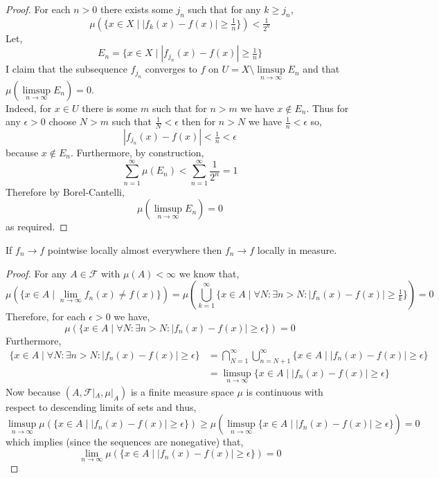 \documentclass[12pt]{article}
\renewcommand{\F}{\mathcal{F}}
\begin{document}
\begin{proof}
For each $n > 0$ there exists some $j_{n}$ such that for any $k \ge j_{n}$,
\[ \mu(\{ x \in X \mid |f_{k}(x) - f(x)| \ge \tfrac{1}{n} \}) < \tfrac{1}{2^n} \]
Let,
\[ E_n = \{ x \in X \mid |f_{j_{n}}(x) - f(x)| \ge \tfrac{1}{n} \} \]
I claim that the subsequence $f_{j_n}$ converges to $f$ on $U = X \setminus \limsup\limits_{n \to \infty} E_n$ and that $\mu \left( \limsup\limits_{n \to \infty} E_n \right) = 0$.
\bigskip\\
Indeed, for $x \in U$ there is some $m$ such that for $n > m$ we have $x \notin E_n$. Thus for any $\epsilon > 0$ choose $N > m$ such that $\frac{1}{N} < \epsilon$ then for $n > N$ we have $\frac{1}{n} < \epsilon$ so,
\[ |f_{j_n}(x) - f(x)| < \tfrac{1}{n} < \epsilon \]
because $x \notin E_n$. Furthermore, by construction,
\[ \sum_{n = 1}^\infty \mu(E_n) < \sum_{n = 1}^\infty \frac{1}{2^n} = 1 \]
Therefore by Borel-Cantelli,
\[ \mu \left( \limsup_{n \to \infty} E_n \right) = 0 \]
as required. 
\end{proof}

\begin{prop}
If $f_n \to f$ pointwise locally almost everywhere then $f_n \to f$ locally in measure.
\end{prop}

\begin{proof}
For any $A \in \F$ with $\mu(A) < \infty$ we know that,
\[ \mu( \{ x \in A \mid \lim_{n \to \infty} f_n(x) \neq f(x) \} ) = \mu \left( \bigcup_{k = 1}^\infty \{ x \in A \mid \forall N : \exists n > N : | f_n(x) - f(x) | \ge \tfrac{1}{k} \} \right) = 0 \]
Therefore, for each $\epsilon > 0$ we have,
\[ \mu( \{ x \in A \mid \forall N : \exists n > N : |f_n(x) - f(x)| \ge \epsilon \}) = 0 \]
Furthermore,
\begin{align*}
\{ x \in A \mid \forall N : \exists n > N : |f_n(x) - f(x)| \ge \epsilon \} & = \bigcap_{N = 1}^\infty \bigcup_{n = N + 1}^\infty \{ x \in A \mid |f_n(x) - f(x)| \ge \epsilon \}
\\
& = \limsup_{n \to \infty} \{ x \in A \mid |f_n(x) - f(x)| \ge \epsilon \}
\end{align*}
Now because $(A, \F|_A, \mu|_A)$ is a finite measure space $\mu$ is continuous with respect to descending limits of sets and thus,
\[ \limsup_{n \to \infty} \mu(\{ x \in A \mid |f_n(x) - f(x)| \ge \epsilon \}) \ge \mu( \limsup_{n \to \infty} \{ x \in A \mid |f_n(x) - f(x)| \ge \epsilon \}) = 0 \]
which implies (since the sequences are nonegative) that,
\[ \lim_{n \to \infty} \mu(\{ x \in A \mid |f_n(x) - f(x)| \ge \epsilon \}) = 0 \]
\end{proof}
\end{document}

